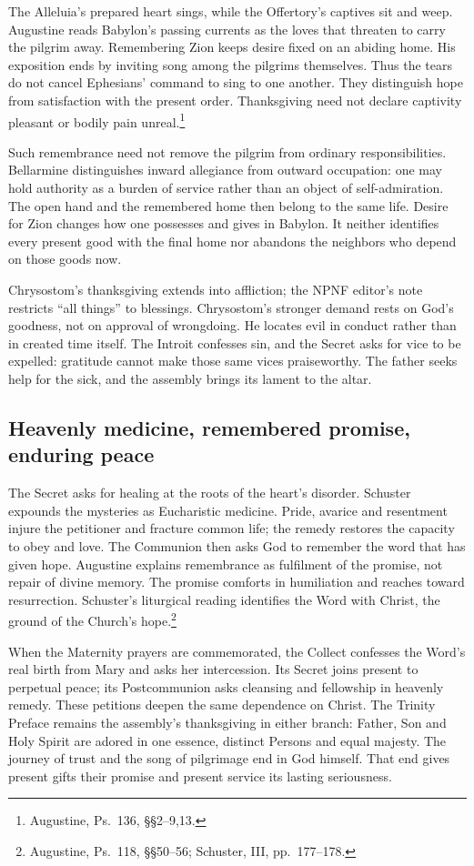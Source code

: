 The Alleluia's prepared heart sings, while the Offertory's captives sit
and weep. Augustine reads Babylon's passing currents as the loves that
threaten to carry the pilgrim away. Remembering Zion keeps desire fixed
on an abiding home. His exposition ends by inviting song among the
pilgrims themselves. Thus the tears do not cancel Ephesians' command
to sing to one another. They distinguish hope from satisfaction with
the present order. Thanksgiving need not declare captivity pleasant
or bodily pain unreal.\footnote{Augustine, Ps.~136, \S\S2--9,13.}

Such remembrance need not remove the pilgrim from ordinary responsibilities.
Bellarmine distinguishes inward allegiance from outward occupation:
one may hold authority as a burden of service rather than an object
of self-admiration. The open hand and the remembered home then belong
to the same life. Desire for Zion changes how one possesses and gives
in Babylon. It neither identifies every present good with the final
home nor abandons the neighbors who depend on those goods now.

Chrysostom's thanksgiving extends into affliction; the NPNF editor's
note restricts ``all things'' to blessings. Chrysostom's stronger demand
rests on God's goodness, not on approval of wrongdoing. He locates evil
in conduct rather than in created time itself. The Introit confesses
sin, and the Secret asks for vice to be expelled: gratitude cannot
make those same vices praiseworthy. The father seeks help for the sick,
and the assembly brings its lament to the altar.

\subsection{Heavenly medicine, remembered promise, enduring peace}
The Secret asks for healing at the roots of the heart's disorder.
Schuster expounds the mysteries as Eucharistic medicine. Pride, avarice
and resentment injure the petitioner and fracture common life; the
remedy restores the capacity to obey and love. The Communion then
asks God to remember the word that has given hope. Augustine explains
remembrance as fulfilment of the promise, not repair of divine memory.
The promise comforts in humiliation and reaches toward resurrection.
Schuster's liturgical reading identifies the Word with Christ, the
ground of the Church's hope.\footnote{Augustine, Ps.~118, \S\S50--56;
Schuster, III, pp.~177--178.}

When the Maternity prayers are commemorated, the Collect confesses
the Word's real birth from Mary and asks her intercession. Its Secret
joins present to perpetual peace; its Postcommunion asks cleansing and
fellowship in heavenly remedy. These petitions deepen the same dependence
on Christ. The Trinity Preface remains the assembly's thanksgiving in
either branch: Father, Son and Holy Spirit are adored in one essence,
distinct Persons and equal majesty. The journey of trust and the song
of pilgrimage end in God himself. That end gives present gifts their
promise and present service its lasting seriousness.
\clearpage
